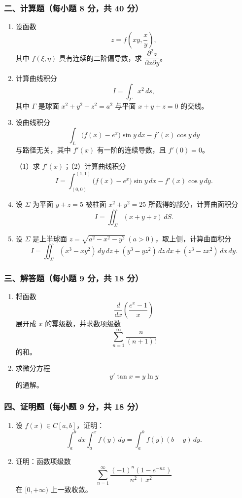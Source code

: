 \subsubsection*{二、计算题（每小题 8 分，共 40 分）}
\begin{enumerate}
  \item 设函数
  \[
  z=f\!\left(xy,\frac{x}{y}\right),
  \]
  其中 $f(\xi,\eta)$ 具有连续的二阶偏导数，求 $\dfrac{\partial^2z}{\partial x\partial y}$。
  \item 计算曲线积分
  \[
  I=\int_\Gamma x^2\,ds,
  \]
  其中 $\Gamma$ 是球面 $x^2+y^2+z^2=a^2$ 与平面 $x+y+z=0$ 的交线。
  \item 设曲线积分
  \[
  \int_L\bigl(f(x)-e^x\bigr)\sin y\,dx-f'(x)\cos y\,dy
  \]
  与路径无关，其中 $f'(x)$ 有一阶的连续导数，且 $f'(0)=0$。

  （1）求 $f'(x)$；（2）计算曲线积分
  \[
  I=\int_{(0,0)}^{(1,1)}\bigl(f(x)-e^x\bigr)\sin y\,dx-f'(x)\cos y\,dy.
  \]

  \item 设 $\Sigma$ 为平面 $y+z=5$ 被柱面 $x^2+y^2=25$ 所截得的部分，计算曲面积分
  \[
  I=\iint_\Sigma (x+y+z)\,dS.
  \]
  \item 设 $\Sigma$ 是上半球面 $z=\sqrt{a^2-x^2-y^2}\ (a>0)$，取上侧，计算曲面积分
  \[
  I=\iint_\Sigma (x^3-xy^2)\,dy\,dz+(y^3-yz^2)\,dz\,dx+(z^3-zx^2)\,dx\,dy.
  \]
\end{enumerate}

\subsubsection*{三、解答题（每小题 9 分，共 18 分）}
\begin{enumerate}
  \item 将函数
  \[
  \frac{d}{dx}\left(\frac{e^x-1}{x}\right)
  \]
  展开成 $x$ 的幂级数，并求数项级数
  \[
  \sum_{n=1}^{\infty}\frac{n}{(n+1)!}
  \]
  的和。
  \item 求微分方程
  \[
  y'\tan x=y\ln y
  \]
  的通解。
\end{enumerate}

\subsubsection*{四、证明题（每小题 9 分，共 18 分）}
\begin{enumerate}
  \item 设 $f(x)\in C[a,b]$，证明：
  \[
  \int_a^b dx\int_a^x f(y)\,dy=\int_a^b f(y)(b-y)\,dy.
  \]
  \item 证明：函数项级数
  \[
  \sum_{n=1}^{\infty}\frac{(-1)^n(1-e^{-nx})}{n^2+x^2}
  \]
  在 $[0,+\infty)$ 上一致收敛。
\end{enumerate}

